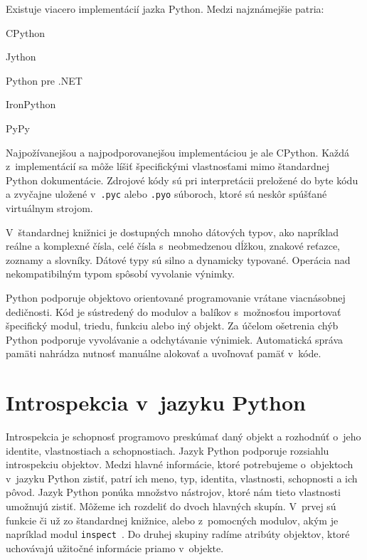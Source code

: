 \documentclass[11pt,oneside,final]{fithesis2}
\begin{document}
Existuje viacero implementácií jazka Python. Medzi najznámejšie patria:
\begin{list}{•}{}
\item CPython
\item Jython
\item Python pre .NET
\item IronPython
\item PyPy
\end{list}

Najpožívanejšou a najpodporovanejšou implementáciou je ale CPython. Každá z~implementácií sa môže líšiť špecifickými vlastnosťami mimo štandardnej Python dokumentácie.
Zdrojové kódy sú pri interpretácii preložené do byte kódu a zvyčajne uložené v~\texttt{.pyc} alebo \texttt{.pyo} súboroch, ktoré sú neskôr spúšťané virtuálnym strojom.

	V~štandardnej knižnici je dostupných mnoho dátových typov, ako napríklad reálne a komplexné čísla, celé čísla s~neobmedzenou dĺžkou, znakové reťazce, zoznamy a slovníky. Dátové typy sú silno a dynamicky typované. Operácia nad nekompatibilným typom spôsobí vyvolanie výnimky.
	
	Python podporuje objektovo orientované programovanie vrátane viacnásobnej dedičnosti. Kód je sústredený do modulov a balíkov s~možnosťou importovať špecifický modul, triedu, funkciu alebo iný objekt. Za účelom ošetrenia chýb Python podporuje vyvolávanie a odchytávanie výnimiek. Automatická správa pamäti nahrádza nutnosť manuálne alokovať a uvoľnovať pamäť v~kóde.~\cite{pythonintro}


	\section{Introspekcia v~jazyku Python}
		Introspekcia je schopnosť programovo preskúmať daný objekt a rozhodnúť o~jeho identite, vlastnostiach a schopnostiach. Jazyk Python podporuje rozsiahlu introspekciu objektov. Medzi hlavné informácie, ktoré potrebujeme o~objektoch v~jazyku Python zistiť, patrí ich meno, typ, identita, vlastnosti, schopnosti a ich pôvod. Jazyk Python ponúka množstvo nástrojov, ktoré nám tieto vlastnosti umožnujú zistiť. Môžeme ich rozdeliť do dvoch hlavných skupín. V~prvej sú funkcie či už zo štandardnej knižnice, alebo z~pomocných modulov, akým je napríklad modul \texttt{inspect}~\cite{inspectmodule}. Do druhej skupiny radíme atribúty objektov, ktoré uchovávajú užitočné informácie priamo v~objekte.
		
\end{document}
